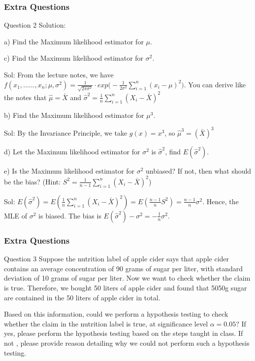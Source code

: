 \documentclass{beamer}
\begin{document}
\begin{frame}
\frametitle{Extra Questions}
\begin{block}{Question 2 Solution:}

a) Find the Maximum likelihood estimator for $\mu$.

c) Find the Maximum likelihood estimator for $\sigma^2$.

Sol: From the lecture notes, we have $f(x_1,......,x_n;\mu,\sigma^2) = \frac{1}{\sqrt{2\pi\sigma^2}} \cdot exp\Big(-\frac{1}{2\sigma^2}\sum_{i=1}^n(x_i - \mu)^2\Big)$. You can derive like the notes that $\hat \mu = \bar X$ and $\hat \sigma^2 = \frac{1}{n} \sum_{i=1}^n (X_i - \bar X)^2$

\vspace{3mm}
b) Find the Maximum likelihood estimator for $\mu^3$.

Sol: By the Invariance Principle, we take $g(x) = x^3$, so $\hat \mu^3 = (\bar X)^3$

\vspace{3mm}

d) Let the Maximum likelihood estimator for $\sigma^2$ is $\hat \sigma^2$, find $E(\hat \sigma^2)$. 

e) Is the Maximum likelihood estimator for $\sigma^2$ unbiased? If not, then what should be the bias? (Hint: $S^2 = \frac{1}{n-1}\sum_{i=1}^n (X_i - \bar X)^2$)

Sol: $E(\hat \sigma^2) = E(\frac{1}{n} \sum_{i=1}^n (X_i - \bar X)^2) = E(\frac{n-1}{n}S^2) = \frac{n-1}{n} \sigma^2$. Hence, the MLE of $\sigma^2$ is biased. The bias is $E(\hat \sigma^2) - \sigma^2 = -\frac{1}{n}\sigma^2$.

\end{block}


\end{frame}

\begin{frame}
\frametitle{Extra Questions}
\begin{block}{Question 3}
Suppose the nutrition label of apple cider says that apple cider contains an average concentration of 90 grams of sugar per liter, with standard deviation of  10 grams of sugar per liter. Now we want to check whether the claim is true. Therefore, we bought 50 liters of apple cider and found that 5050g sugar are contained in the 50 liters of apple cider in total. 

\vspace{5mm}
Based on this information, could we perform a hypothesis testing to check whether the claim in the nutrition label is true, at significance level $\alpha = 0.05$? If yes, please perform the hypothesis testing based on the steps taught in class. If not , please provide reason detailing why we could not perform such a hypothesis testing.

\end{block}
\end{frame}
\end{document}
